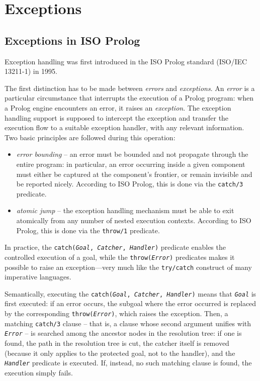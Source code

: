 \chapter{\tuprolog{} Exceptions}
\label{ch:exceptions}

\section{Exceptions in ISO Prolog}
\label{sec:exceptions in ISO prolog}
Exception handling was first introduced in the ISO Prolog standard (ISO/IEC 13211-1) in 1995.

The first distinction has to be made between \textit{errors} and \textit{exceptions}.
%
An \textit{error} is a particular circumstance that interrupts the execution of a Prolog program: when a Prolog engine encounters an error, it raises an \textit{exception}.
%
The exception handling support is supposed to intercept the exception and transfer the execution flow to a suitable exception handler, with any relevant information. Two basic principles are followed during this operation:

\begin{itemize}
  \item \textit{error bounding} -- an error must be bounded and not propagate through the entire program: in particular, an error occurring inside a given component must either be captured at the component's frontier, or remain invisible and be reported nicely.
      According to ISO Prolog, this is done via the \texttt{catch/3} predicate.

  \item \textit{atomic jump} -- the exception handling mechanism must be able to exit atomically from any number of nested execution contexts. According to ISO Prolog, this is done via the \texttt{throw/1} predicate.
\end{itemize}
%
In practice, the \texttt{catch(\textit{Goal}, \textit{Catcher}, \textit{Handler})} predicate enables the controlled execution of a goal, while the \texttt{throw(\textit{Error})} predicates makes it possible to raise an exception---very much like the \texttt{try/catch} construct of many imperative languages.

Semantically, executing the \texttt{catch(\textit{Goal}, \textit{Catcher}, \textit{Handler})} means that \texttt{\textit{Goal}} is first executed: if an error occurs, the subgoal where the error occurred is replaced by the corresponding \texttt{throw(\textit{Error})}, which raises the exception.
%
Then, a matching \texttt{catch/3} clause -- that is, a clause whose second argument
unifies with \texttt{\textit{Error}} -- is searched among the ancestor nodes in the resolution tree: if one is found, the path in the resolution tree is cut, the catcher itself is removed (because it only applies to the protected goal, not to the handler), and the \texttt{\textit{Handler}} predicate is executed. If, instead, no such matching clause is found, the execution simply fails.

